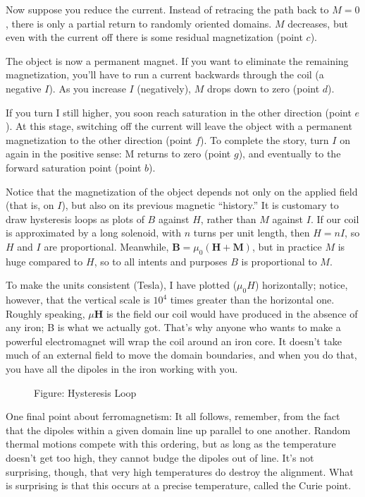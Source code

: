 \documentclass[../../../main.tex]{subfiles}
\begin{document}
Now suppose you reduce the current. Instead of retracing the path back to $M = 0$, there is only a partial return to randomly oriented domains. $M$ decreases, but even with the current off there is some residual magnetization (point $c$). 

The object is now a permanent magnet. If you want to eliminate the remaining magnetization, you’ll have to run a current backwards through the coil (a negative $I$). As you increase $I$ (negatively), $M$ drops down to zero (point $d$). 

If you turn I still higher, you soon reach saturation in the other direction (point $e$). At this stage, switching off the current will leave the object with a permanent magnetization to the other direction (point $f$). To complete the story, turn $I$ on again in the positive sense: M returns to zero (point $g$), and eventually to the forward saturation point (point $b$).

Notice that the magnetization of the object depends not only on the applied ﬁeld (that is, on $I$), but also on its previous magnetic “history.” It is customary to draw hysteresis loops as plots of $B$ against $H$, rather than $M$ against $I$. If our coil is approximated by a long solenoid, with $n$ turns per unit length, then $H = nI $, so $H$ and $I$ are proportional. Meanwhile, $\mathbf{B} = \mu_0(\mathbf{H} + \mathbf{M})$, but in practice $M$ is huge compared to $H$, so to all intents and purposes $B$ is proportional to $M$.

To make the units consistent (Tesla), I have plotted ($\mu_0 H$) horizontally; notice, however, that the vertical scale is $10^4$ times greater than the horizontal one. Roughly speaking, $\mu\mathbf{H}$ is the ﬁeld our coil would have produced in the absence of any iron; B is what we actually got. That’s why anyone who wants to make a powerful electromagnet will wrap the coil around an iron core. It doesn’t take much of an external ﬁeld to move the domain boundaries, and when you do that, you have all the dipoles in the iron working with you.

\begin{figure*}
    \centering
    \caption*{Figure: Hysteresis Loop}
\end{figure*}
One ﬁnal point about ferromagnetism: It all follows, remember, from the fact that the dipoles within a given domain line up parallel to one another. Random thermal motions compete with this ordering, but as long as the temperature doesn’t get too high, they cannot budge the dipoles out of line. It’s not surprising, though, that very high temperatures do destroy the alignment. What is surprising is that this occurs at a precise temperature, called the Curie point.
\end{document}
